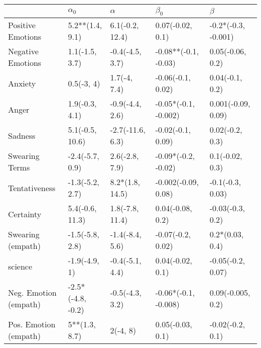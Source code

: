 \begin{tabular}{lllll}
\toprule
{} &         $\alpha_0$ &          $\alpha$ &             $\beta_0$ &              $\beta$ \\
\midrule
Positive Emotions     &    5.2**(1.4, 9.1) &   6.1(-0.2, 12.4) &      0.07(-0.02, 0.1) &  -0.2*(-0.3, -0.001) \\
Negative Emotions     &     1.1(-1.5, 3.7) &   -0.4(-4.5, 3.7) &  -0.08**(-0.1, -0.03) &     0.05(-0.06, 0.2) \\
Anxiety               &         0.5(-3, 4) &      1.7(-4, 7.4) &     -0.06(-0.1, 0.02) &      0.04(-0.1, 0.2) \\
Anger                 &     1.9(-0.3, 4.1) &   -0.9(-4.4, 2.6) &  -0.05*(-0.1, -0.002) &   0.001(-0.09, 0.09) \\
Sadness               &    5.1(-0.5, 10.6) &  -2.7(-11.6, 6.3) &     -0.02(-0.1, 0.09) &      0.02(-0.2, 0.3) \\
Swearing Terms        &    -2.4(-5.7, 0.9) &    2.6(-2.8, 7.9) &   -0.09*(-0.2, -0.02) &      0.1(-0.02, 0.3) \\
Tentativeness         &    -1.3(-5.2, 2.7) &   8.2*(1.8, 14.5) &   -0.002(-0.09, 0.08) &     -0.1(-0.3, 0.03) \\
Certainty             &    5.4(-0.6, 11.3) &   1.8(-7.8, 11.4) &      0.04(-0.08, 0.2) &     -0.03(-0.3, 0.2) \\
Swearing (empath)     &    -1.5(-5.8, 2.8) &   -1.4(-8.4, 5.6) &     -0.07(-0.2, 0.02) &      0.2*(0.03, 0.4) \\
science               &      -1.9(-4.9, 1) &   -0.4(-5.1, 4.4) &      0.04(-0.02, 0.1) &    -0.05(-0.2, 0.07) \\
Neg. Emotion (empath) &  -2.5*(-4.8, -0.2) &   -0.5(-4.3, 3.2) &  -0.06*(-0.1, -0.008) &    0.09(-0.005, 0.2) \\
Pos. Emotion (empath) &      5**(1.3, 8.7) &          2(-4, 8) &      0.05(-0.03, 0.1) &     -0.02(-0.2, 0.1) \\
\bottomrule
\end{tabular}
